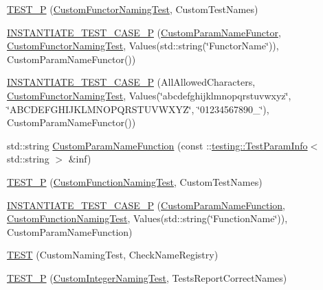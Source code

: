 \begin{DoxyCompactItemize}
\item 
\mbox{\hyperlink{googletest-param-test-test_8cc_a64b9799ff848fbf906c2e5c93a66434a}{T\+E\+S\+T\+\_\+P}} (\mbox{\hyperlink{classCustomFunctorNamingTest}{Custom\+Functor\+Naming\+Test}}, Custom\+Test\+Names)
\item 
\mbox{\hyperlink{googletest-param-test-test_8cc_a4ff0a3d609ba73d519d096f1eb6bec29}{I\+N\+S\+T\+A\+N\+T\+I\+A\+T\+E\+\_\+\+T\+E\+S\+T\+\_\+\+C\+A\+S\+E\+\_\+P}} (\mbox{\hyperlink{structCustomParamNameFunctor}{Custom\+Param\+Name\+Functor}}, \mbox{\hyperlink{classCustomFunctorNamingTest}{Custom\+Functor\+Naming\+Test}}, Values(std\+::string(\char`\"{}Functor\+Name\char`\"{})), Custom\+Param\+Name\+Functor())
\item 
\mbox{\hyperlink{googletest-param-test-test_8cc_a14b9b9d7ef2da5e030f760f5b54ae328}{I\+N\+S\+T\+A\+N\+T\+I\+A\+T\+E\+\_\+\+T\+E\+S\+T\+\_\+\+C\+A\+S\+E\+\_\+P}} (All\+Allowed\+Characters, \mbox{\hyperlink{classCustomFunctorNamingTest}{Custom\+Functor\+Naming\+Test}}, Values(\char`\"{}abcdefghijklmnopqrstuvwxyz\char`\"{}, \char`\"{}A\+B\+C\+D\+E\+F\+G\+H\+I\+J\+K\+L\+M\+N\+O\+P\+Q\+R\+S\+T\+U\+V\+W\+X\+YZ\char`\"{}, \char`\"{}01234567890\+\_\+\char`\"{}), Custom\+Param\+Name\+Functor())
\item 
std\+::string \mbox{\hyperlink{googletest-param-test-test_8cc_a016a6f23e3fe3de5183e5493cf4bcc4f}{Custom\+Param\+Name\+Function}} (const \+::\mbox{\hyperlink{structtesting_1_1TestParamInfo}{testing\+::\+Test\+Param\+Info}}$<$ std\+::string $>$ \&inf)
\item 
\mbox{\hyperlink{googletest-param-test-test_8cc_a72ff5cb3613a060e1a62f14fa3fa1b52}{T\+E\+S\+T\+\_\+P}} (\mbox{\hyperlink{classCustomFunctionNamingTest}{Custom\+Function\+Naming\+Test}}, Custom\+Test\+Names)
\item 
\mbox{\hyperlink{googletest-param-test-test_8cc_a2dac83a6fce73f581d62a31f27c29db4}{I\+N\+S\+T\+A\+N\+T\+I\+A\+T\+E\+\_\+\+T\+E\+S\+T\+\_\+\+C\+A\+S\+E\+\_\+P}} (\mbox{\hyperlink{googletest-param-test-test_8cc_a016a6f23e3fe3de5183e5493cf4bcc4f}{Custom\+Param\+Name\+Function}}, \mbox{\hyperlink{classCustomFunctionNamingTest}{Custom\+Function\+Naming\+Test}}, Values(std\+::string(\char`\"{}Function\+Name\char`\"{})), Custom\+Param\+Name\+Function)
\item 
\mbox{\hyperlink{googletest-param-test-test_8cc_a19d5fdc7df4c845bc0f2e7c50368e2a6}{T\+E\+ST}} (Custom\+Naming\+Test, Check\+Name\+Registry)
\item 
\mbox{\hyperlink{googletest-param-test-test_8cc_a0c9938b5941817c8181cab2de13ae24d}{T\+E\+S\+T\+\_\+P}} (\mbox{\hyperlink{classCustomIntegerNamingTest}{Custom\+Integer\+Naming\+Test}}, Tests\+Report\+Correct\+Names)

\end{DoxyCompactItemize}
